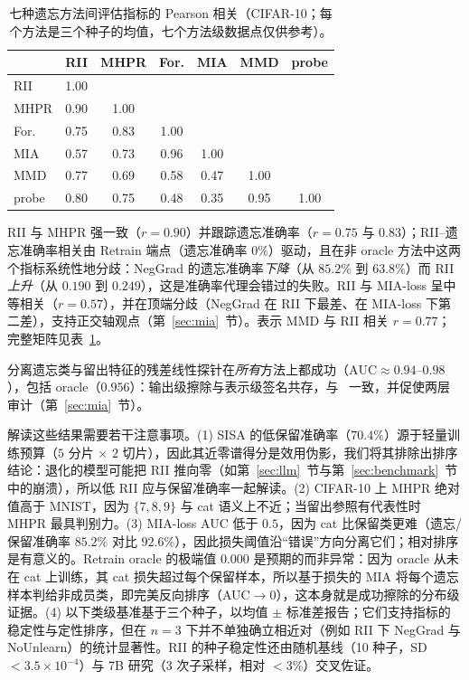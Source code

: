 \begin{table}[t]
\centering
\small
\caption{七种遗忘方法间评估指标的 Pearson 相关（CIFAR-10；每个方法是三个种子的均值，七个方法级数据点仅供参考）。}
\label{tab:corr}
\setlength{\tabcolsep}{4pt}
\begin{tabular}{l c c c c c c}
\toprule
 & RII & MHPR & For. & MIA & MMD & probe \\
\midrule
RII & 1.00 & & & & & \\
MHPR & 0.90 & 1.00 & & & & \\
For. & 0.75 & 0.83 & 1.00 & & & \\
MIA & 0.57 & 0.73 & 0.96 & 1.00 & & \\
MMD & 0.77 & 0.69 & 0.58 & 0.47 & 1.00 & \\
probe & 0.80 & 0.75 & 0.48 & 0.35 & 0.95 & 1.00 \\
\bottomrule
\end{tabular}
\end{table}

RII 与 MHPR 强一致（$r{=}0.90$）并跟踪遗忘准确率（$r{=}0.75$ 与 $0.83$）；RII--遗忘准确率相关由 Retrain 端点（遗忘准确率 $0\%$）驱动，且在非 oracle 方法中这两个指标系统性地分歧：NegGrad 的遗忘准确率\emph{下降}（从 $85.2\%$ 到 $63.8\%$）而 RII\emph{上升}（从 $0.190$ 到 $0.249$），这是准确率代理会错过的失败。RII 与 MIA-loss 呈中等相关（$r{=}0.57$），并在顶端分歧（NegGrad 在 RII 下最差、在 MIA-loss 下第二差），支持正交轴观点（第~\ref{sec:mia}~节）。表示 MMD 与 RII 相关 $r{=}0.77$；完整矩阵见表~\ref{tab:corr}。

分离遗忘类与留出特征的残差线性探针在\emph{所有}方法上都成功（$\mathrm{AUC}\approx0.94$--$0.98$），包括 oracle（$0.956$）：输出级擦除与表示级签名共存，与~\cite{cosma2026ruler,yong2026erased} 一致，并促使两层审计（第~\ref{sec:mia}~节）。

解读这些结果需要若干注意事项。(1) SISA 的低保留准确率（$70.4\%$）源于轻量训练预算（$5$ 分片 $\times$ $2$ 切片），因此其近零谱得分是效用伪影，我们将其排除出排序结论：退化的模型可能把 RII 推向零（如第~\ref{sec:llm}~节与第~\ref{sec:benchmark}~节中的崩溃），所以低 RII 应与保留准确率一起解读。(2) CIFAR-10 上 MHPR 绝对值高于 MNIST，因为 $\{7,8,9\}$ 与 cat 语义上不近；当留出参照有代表性时 MHPR 最具判别力。(3) MIA-loss AUC 低于 $0.5$，因为 cat 比保留类更难（遗忘/保留准确率 $85.2\%$ 对比 $92.6\%$），因此损失阈值沿``错误''方向分离它们；相对排序是有意义的。Retrain oracle 的极端值 $0.000$ 是预期的而非异常：因为 oracle 从未在 cat 上训练，其 cat 损失超过每个保留样本，所以基于损失的 MIA 将每个遗忘样本判给非成员类，即完美反向排序（AUC${\to}0$），这本身就是成功擦除的分布级证据。(4) 以下类级基准基于三个种子，以均值 $\pm$ 标准差报告；它们支持指标的稳定性与定性排序，但在 $n{=}3$ 下并不单独确立相近对（例如 RII 下 NegGrad 与 NoUnlearn）的统计显著性。RII 的种子稳定性还由随机基线（10 种子，SD$<3.5{\times}10^{-4}$）与 7B 研究（3 次子采样，相对 $<$3\%）交叉佐证。

